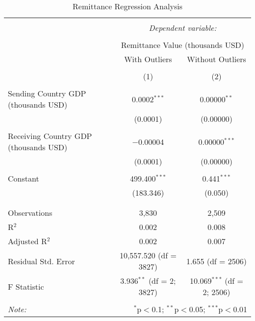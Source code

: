 
\begin{table}[!htbp] \centering 
  \caption{Remittance Regression Analysis} 
  \label{} 
\begin{tabular}{@{\extracolsep{5pt}}lcc} 
\\[-1.8ex]\hline 
\hline \\[-1.8ex] 
 & \multicolumn{2}{c}{\textit{Dependent variable:}} \\ 
\cline{2-3} 
\\[-1.8ex] & \multicolumn{2}{c}{Remittance Value (thousands USD)} \\ 
 & With Outliers & Without Outliers \\ 
\\[-1.8ex] & (1) & (2)\\ 
\hline \\[-1.8ex] 
 Sending Country GDP (thousands USD) & 0.0002$^{***}$ & 0.00000$^{**}$ \\ 
  & (0.0001) & (0.00000) \\ 
  & & \\ 
 Receiving Country GDP (thousands USD) & $-$0.00004 & 0.00000$^{***}$ \\ 
  & (0.0001) & (0.00000) \\ 
  & & \\ 
 Constant & 499.400$^{***}$ & 0.441$^{***}$ \\ 
  & (183.346) & (0.050) \\ 
  & & \\ 
\hline \\[-1.8ex] 
Observations & 3,830 & 2,509 \\ 
R$^{2}$ & 0.002 & 0.008 \\ 
Adjusted R$^{2}$ & 0.002 & 0.007 \\ 
Residual Std. Error & 10,557.520 (df = 3827) & 1.655 (df = 2506) \\ 
F Statistic & 3.936$^{**}$ (df = 2; 3827) & 10.069$^{***}$ (df = 2; 2506) \\ 
\hline 
\hline \\[-1.8ex] 
\textit{Note:}  & \multicolumn{2}{r}{$^{*}$p$<$0.1; $^{**}$p$<$0.05; $^{***}$p$<$0.01} \\ 
\end{tabular} 
\end{table} 
